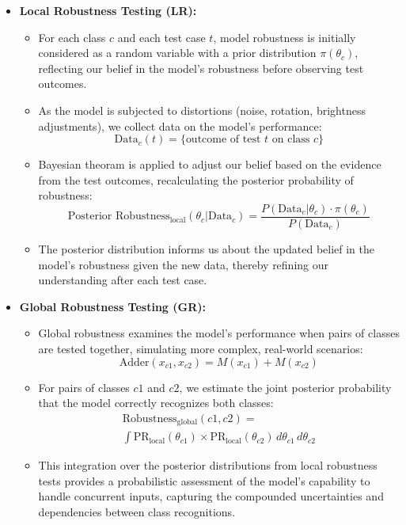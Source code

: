 \documentclass[10pt, conference, a4paper, final]{IEEEtran}
\begin{document}
\begin{itemize}
    \item \textbf{Local Robustness Testing (LR):}
        \begin{itemize}
            \item For each class \( c \) and each test case \( t \), model robustness is initially considered as a random variable with a prior distribution \( \pi(\theta_c) \), reflecting our belief in the model's robustness before observing test outcomes.
            \item As the model is subjected to distortions (noise, rotation, brightness adjustments), we collect data on the model's performance:
            \[ \text{Data}_c(t) = \{ \text{outcome of test } t \text{ on class } c\} \]
            \item Bayesian theoram is applied to adjust our belief based on the evidence from the test outcomes, recalculating the posterior probability of robustness:
            {\footnotesize\[
                \text{Posterior Robustness}_{\text{local}}(\theta_c | \text{Data}_c) =
                \frac{P(\text{Data}_c | \theta_c) \cdot \pi(\theta_c)}{P(\text{Data}_c)}
            \]}
      


            \item The posterior distribution informs us about the updated belief in the model’s robustness given the new data, thereby refining our understanding after each test case.
        \end{itemize}

        
    \item \textbf{Global Robustness Testing (GR):}
    \begin{itemize}
        \item Global robustness examines the model's performance when pairs of classes are tested together, simulating more complex, real-world scenarios:
        \[ \text{Adder}(x_{c1}, x_{c2}) = M(x_{c1}) + M(x_{c2}) \]
        
        \item For pairs of classes \( c1 \) and \( c2 \), we estimate the joint posterior probability that the model correctly recognizes both classes:
        {\footnotesize
        \begin{multline}
            \text{Robustness}_{\text{global}}(c1, c2) = \\
            \int \text{PR}_{\text{local}}(\theta_{c1}) \times \text{PR}_{\text{local}}(\theta_{c2}) \, d\theta_{c1} \, d\theta_{c2}
        \end{multline}
        }
        
        \item This integration over the posterior distributions from local robustness tests provides a probabilistic assessment of the model's capability to handle concurrent inputs, capturing the compounded uncertainties and dependencies between class recognitions.
    \end{itemize}
    
\end{itemize}
\end{document}
